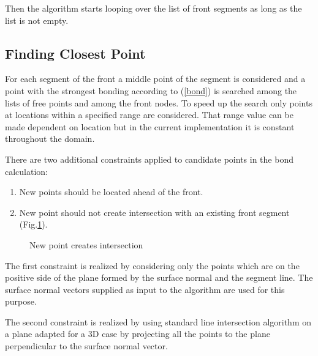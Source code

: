 \documentclass[12pt]{article}
\begin{document}
Then the algorithm starts looping over the list of front segments as long as the list is not empty.

\subsection{Finding Closest Point}

For each segment of the front a middle point of the segment is considered and a
point with the strongest bonding according to (\ref{bond}) is searched
among the lists of free points and among the front nodes. 
To speed up the search only points at locations within a specified
range are considered. That range value can be made dependent on location but
in the current implementation it is constant throughout the domain.

There are two additional constraints applied to candidate points in the bond calculation:

\begin{enumerate}
\item New points should be located ahead of the front.
\item New point should not create intersection with an existing front segment (Fig.\ref{intersect}).
\end{enumerate}

\begin{figure}
\center
{}
\caption{\label{intersect}New point creates intersection}
\end{figure}

The first constraint is realized by considering only the points which are on
the positive side of the plane formed by the surface normal and the segment
line. The surface normal vectors supplied as input to the algorithm are used
for this purpose.

The second constraint is realized by using standard line intersection algorithm
on a plane adapted for a 3D case by projecting all the points to the plane
perpendicular to the surface normal vector.
\end{document}
